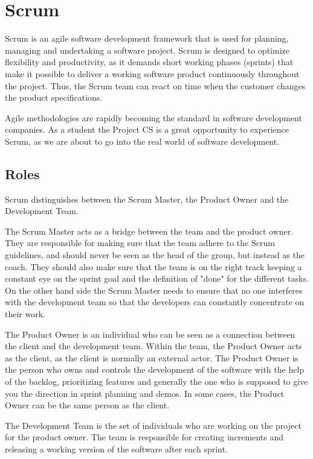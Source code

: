 \section{Scrum}
\label{sec:scrum}
Scrum is an agile software development framework that is used for planning, managing
and undertaking a software project. Scrum is designed to optimize flexibility and productivity,
as it demands short working phases (sprints) that make it possible to deliver
a working software product continuously throughout the project. Thus, the Scrum team
can react on time when the customer changes the product specifications.

Agile methodologies are rapidly becoming the standard
in software development companies. As a student the Project CS is a great opportunity
to experience Scrum, as we are about to go into the real world of software development.

\subsection{Roles}

Scrum distinguishes between the Scrum Master, the Product Owner and the Development Team.

The Scrum Master acts as a bridge between the team and the product owner. 
They are responsible for making sure that the team adhere to the Scrum guidelines,
and should never be seen as the head of the group, but instead as the coach.
They should also make sure that the team is on the right track keeping a constant eye on the sprint goal
and the definition of "done" for the different tasks. On the other hand side the Scrum Master
needs to ensure that no one interferes with the development team so that the developers
can constantly concentrate on their work.

The Product Owner is an individual who can be seen as a connection between the client and
the development team. Within the team, the Product Owner acts as the client, as the client
is normally an external actor.
The Product Owner is the person who owns and controls the development of the software with the help of the backlog,
prioritizing features and generally the one who is supposed to give you the direction in sprint planning and demos.
In some cases, the Product Owner can be the same person as the client.

The Development Team is the set of individuals who are working on the project for the product owner.
The team is responsible for creating increments and releasing a working version of the software
after each sprint.


